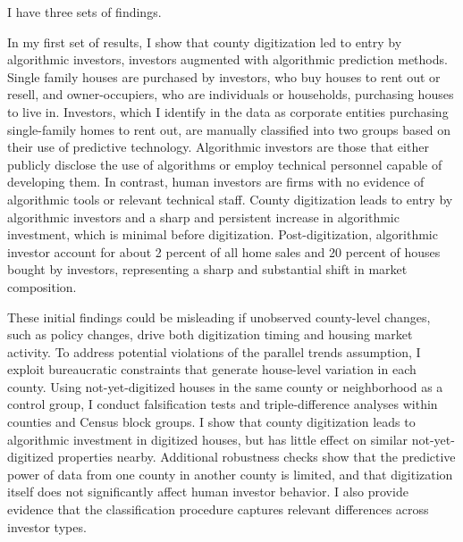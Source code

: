 \documentclass[11pt]{article}
\newcommand{\LR}[1]{{\color{blue}{[LR: #1]}}}
\begin{document}
I have three sets of findings. 

In my first set of results, I show that county digitization led to entry by algorithmic investors, investors augmented with algorithmic prediction methods. Single family houses are purchased by investors, who buy houses to rent out or resell, and owner-occupiers, who are individuals or households, purchasing houses to live in. Investors, which I identify in the data as corporate entities purchasing single-family homes to rent out, are manually classified into two groups based on their use of predictive technology. Algorithmic investors are those that either publicly disclose the use of algorithms or employ technical personnel capable of developing them. In contrast, human investors are firms with no evidence of algorithmic tools or relevant technical staff. County digitization leads to entry by algorithmic investors and a sharp and persistent increase in algorithmic investment, which is minimal before digitization. Post-digitization, algorithmic investor account for about 2 percent of all home sales and 20 percent of houses bought by investors, representing a sharp and substantial shift in market composition.



These initial findings could be misleading if unobserved county-level changes, such as policy changes, drive both digitization timing and housing market activity. To address potential violations of the parallel trends assumption, I exploit bureaucratic constraints that generate house-level variation in each county. Using not-yet-digitized houses in the same county or neighborhood as a control group, I conduct falsification tests and triple-difference analyses within counties and Census block groups. I show that county digitization leads to algorithmic investment in digitized houses, but has little effect on similar not-yet-digitized properties nearby. Additional robustness checks show that the predictive power of data from one county in another county is limited, and that digitization itself does not significantly affect human investor behavior. I also provide evidence that the classification procedure captures relevant differences across investor types.
\end{document}
